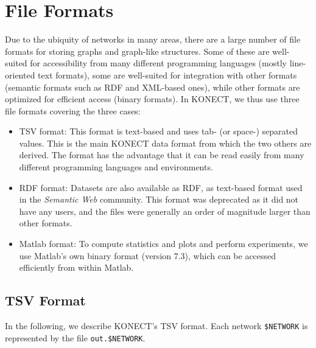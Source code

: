 \documentclass{article}
\begin{document}
\section{File Formats}
\label{sec:format}
Due to the ubiquity of networks in many areas, there are a large number
of file formats for storing graphs and graph-like structures.  Some of
these are well-suited for accessibility from many different programming
languages (mostly line-oriented text formats), some are well-suited for
integration with other formats (semantic formats such as RDF and
XML-based ones), while other formats are optimized for efficient access
(binary formats).  In KONECT, we thus use three file formats covering
the three cases:
\begin{itemize}
\item TSV format: This format is text-based and uses tab- (or space-) separated 
  values.  This is the main KONECT data format from which the two others
  are derived.  The format has the advantage that it can be read easily
  from many different programming languages and environments.
\item RDF format: Datasets are also available as RDF, as text-based
  format used in the \emph{Semantic Web} community.  
  This format was deprecated as it did not have any users, and the files
  were generally an order of magnitude larger than other formats. 
\item Matlab format: To compute statistics and plots and perform
  experiments, we use Matlab's own binary format (version 7.3), which can be accessed
  efficiently from within Matlab.
\end{itemize}

\subsection{TSV Format}
In the following, we describe KONECT's TSV format.  Each network
\texttt{\$NETWORK} is represented by the file \texttt{out.\$NETWORK}. 
\end{document}
